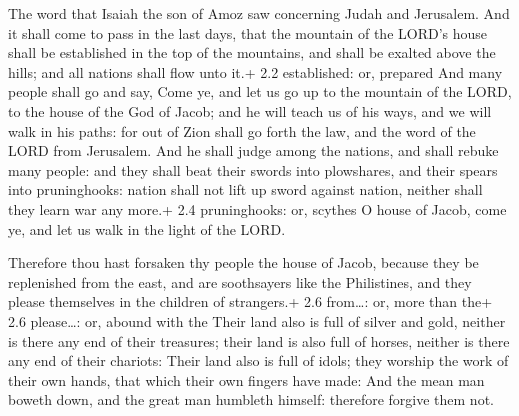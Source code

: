  The word that Isaiah the son of Amoz saw concerning Judah
and Jerusalem.  And it shall come to pass in the last days,
that the mountain of the LORD's house shall be established in the top of
the mountains, and shall be exalted above the hills; and all nations
shall flow unto it.+ 2.2 established: or, prepared  And many
people shall go and say, Come ye, and let us go up to the mountain of
the LORD, to the house of the God of Jacob; and he will teach us of his
ways, and we will walk in his paths: for out of Zion shall go forth the
law, and the word of the LORD from Jerusalem.  And he shall
judge among the nations, and shall rebuke many people: and they shall
beat their swords into plowshares, and their spears into pruninghooks:
nation shall not lift up sword against nation, neither shall they learn
war any more.+ 2.4 pruninghooks: or, scythes  O house of
Jacob, come ye, and let us walk in the light of the LORD.

 Therefore thou hast forsaken thy people the house of
Jacob, because they be replenished from the east, and are soothsayers
like the Philistines, and they please themselves in the children of
strangers.+ 2.6 from\ldots: or, more than the+ 2.6 please\ldots: or,
abound with the  Their land also is full of silver and gold,
neither is there any end of their treasures; their land is also full of
horses, neither is there any end of their chariots:  Their
land also is full of idols; they worship the work of their own hands,
that which their own fingers have made:  And the mean man
boweth down, and the great man humbleth himself: therefore forgive them
not.

